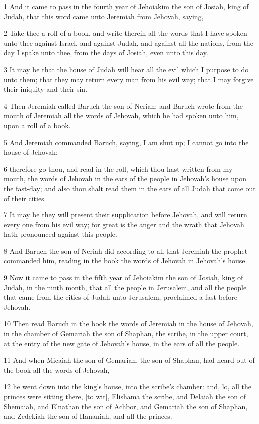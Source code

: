 \par 1 And it came to pass in the fourth year of Jehoiakim the son of Josiah, king of Judah, that this word came unto Jeremiah from Jehovah, saying,
\par 2 Take thee a roll of a book, and write therein all the words that I have spoken unto thee against Israel, and against Judah, and against all the nations, from the day I spake unto thee, from the days of Josiah, even unto this day.
\par 3 It may be that the house of Judah will hear all the evil which I purpose to do unto them; that they may return every man from his evil way; that I may forgive their iniquity and their sin.
\par 4 Then Jeremiah called Baruch the son of Neriah; and Baruch wrote from the mouth of Jeremiah all the words of Jehovah, which he had spoken unto him, upon a roll of a book.
\par 5 And Jeremiah commanded Baruch, saying, I am shut up; I cannot go into the house of Jehovah:
\par 6 therefore go thou, and read in the roll, which thou hast written from my mouth, the words of Jehovah in the ears of the people in Jehovah's house upon the fast-day; and also thou shalt read them in the ears of all Judah that come out of their cities.
\par 7 It may be they will present their supplication before Jehovah, and will return every one from his evil way; for great is the anger and the wrath that Jehovah hath pronounced against this people.
\par 8 And Baruch the son of Neriah did according to all that Jeremiah the prophet commanded him, reading in the book the words of Jehovah in Jehovah's house.
\par 9 Now it came to pass in the fifth year of Jehoiakim the son of Josiah, king of Judah, in the ninth month, that all the people in Jerusalem, and all the people that came from the cities of Judah unto Jerusalem, proclaimed a fast before Jehovah.
\par 10 Then read Baruch in the book the words of Jeremiah in the house of Jehovah, in the chamber of Gemariah the son of Shaphan, the scribe, in the upper court, at the entry of the new gate of Jehovah's house, in the ears of all the people.
\par 11 And when Micaiah the son of Gemariah, the son of Shaphan, had heard out of the book all the words of Jehovah,
\par 12 he went down into the king's house, into the scribe's chamber: and, lo, all the princes were sitting there, [to wit], Elishama the scribe, and Delaiah the son of Shemaiah, and Elnathan the son of Achbor, and Gemariah the son of Shaphan, and Zedekiah the son of Hananiah, and all the princes.
